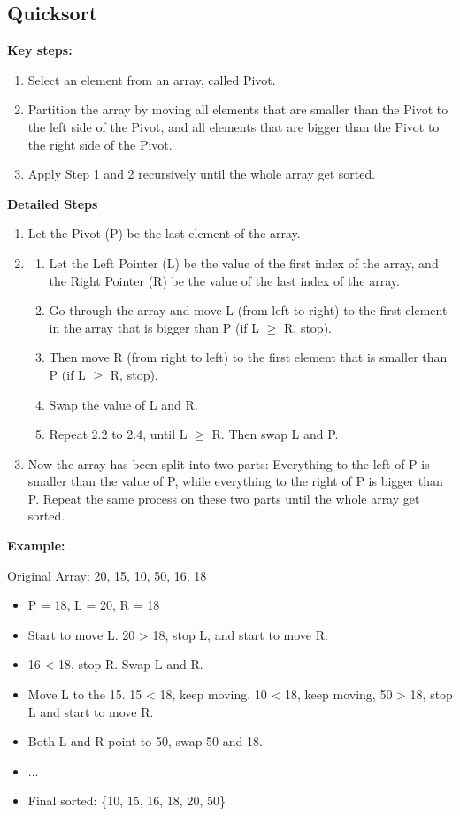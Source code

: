 \subsection{Quicksort}

\textbf{Key steps:}
\begin{enumerate}
  \item Select an element from an array, called Pivot.
  \item Partition the array by moving all elements that are smaller than the Pivot to the left side of the Pivot, and all elements that are bigger than the Pivot to the right side of the Pivot.
  \item Apply Step 1 and 2 recursively until the whole array get sorted.
\end{enumerate}

\textbf{Detailed Steps} 
\begin{enumerate}[label=\arabic*:]
  \item Let the Pivot (P) be the last element of the array.
  \item 
  \begin{enumerate}[label*=\arabic*.]
    \item Let the Left Pointer (L) be the value of the first index of the array, and the Right Pointer (R) be the value of the last index of the array.
    \item Go through the array and move L (from left to right) to the first element in the array that is bigger than P (if L $\geq$ R, stop).
    \item Then move R (from right to left) to the first element that is smaller than P (if L $\geq$ R, stop).
    \item Swap the value of L and R.
    \item Repeat 2.2 to 2.4, until L $\geq$ R. Then swap L and P.
  \end{enumerate}
  \item Now the array has been split into two parts: Everything to the left of P is smaller than the value of P, while everything to the right of P is bigger than P. Repeat the same process on these two parts until the whole array get sorted.
\end{enumerate}


\textbf{Example:}

\begin{center}
Original Array: 20, 15, 10, 50, 16, 18
\end{center}

\begin{itemize}
  \item P = 18, L = 20, R = 18
  \item Start to move L. 20 > 18, stop L, and start to move R.
  \item 16 < 18, stop R. Swap L and R.
  \item Move L to the 15. 15 < 18, keep moving. 10 < 18, keep moving, 50 > 18, stop L and start to move R.
  \item Both L and R point to 50, swap 50 and 18.
  \item ...
  \item Final sorted: \{10, 15, 16, 18, 20, 50\}
\end{itemize}

